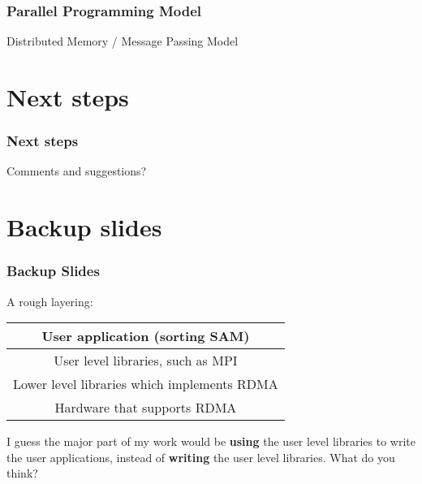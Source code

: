 \documentclass{beamer}
\begin{document}

\begin{frame}
\frametitle{Parallel Programming Model}

Distributed Memory / Message Passing Model

\end{frame}


\section{Next steps}


\begin{frame}
\frametitle{Next steps}

Comments and suggestions?

\end{frame}


\section{Backup slides}


\begin{frame}
\frametitle{Backup Slides}

A rough layering:

\begin{center}
    \begin{tabular}{|c|} 
    \hline
    User application (sorting SAM) \\
    \hline
    User level libraries, such as MPI \\
    \hline
    Lower level libraries which implements RDMA \\
    \hline
    Hardware that supports RDMA \\
    \hline
    \end{tabular}
\end{center}

I guess the major part of my work would be \textbf{using} the user level libraries to write the user applications, 
instead of \textbf{writing} the user level libraries. 
What do you think?

\end{frame}
\end{document}
